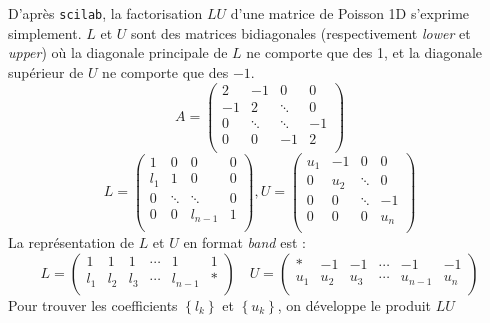 \documentclass{article}
\begin{document}
D'après \texttt{scilab}, la factorisation $LU$ d'une matrice de Poisson 1D s'exprime simplement. $L$ et $U$ sont des matrices bidiagonales (respectivement \textit{lower} et \textit{upper}) où la diagonale principale de $L$ ne comporte que des 1, et la diagonale supérieur de $U$ ne comporte que des $-1$.
\[
	A = 
	\begin{pmatrix}
			2	& 	-1	&	0	& 0	\\
			-1	&	2	&\ddots	& 0	\\
			0	& \ddots&\ddots	&-1	\\
			0	& 	0	& -1 	& 2	\\
	\end{pmatrix}
\]
\[
	L = 
	\begin{pmatrix}
			1	& 	0	&	0	& 0	\\
			l_1	&	1	&	0	& 0	\\
			0	& \ddots&\ddots	& 0	\\
			0	& 	0	& l_{n-1} 	& 1	\\
	\end{pmatrix},
	U = 
	\begin{pmatrix}
			u_1	& 	-1	&	0	& 0	\\
			0	&	u_2	&\ddots	& 0	\\
			0	& 	0	&\ddots	& -1\\
			0	& 	0	& 0 	& u_n	\\
	\end{pmatrix}
\]
La représentation de $L$ et $U$ en format \textit{band} est :
\[
	L = 
	\begin{pmatrix}
		1	& 	1	&	1	&	\cdots	&	1		&	1	\\
		l_1	& 	l_2	&	l_3	&	\cdots	&	l_{n-1}	&	\ast	\\
	\end{pmatrix}
	\quad
	U = 
	\begin{pmatrix}
		\ast& 	-1	&	-1	&	\cdots	&	-1		&	-1	\\
		u_1	& 	u_2	&	u_3	&	\cdots	&	u_{n-1}	&	u_n	\\
	\end{pmatrix}
\]
Pour trouver les coefficients $\left\lbrace l_k \right\rbrace$ et $\left\lbrace u_k \right\rbrace$, on développe le produit $LU$
\end{document}
